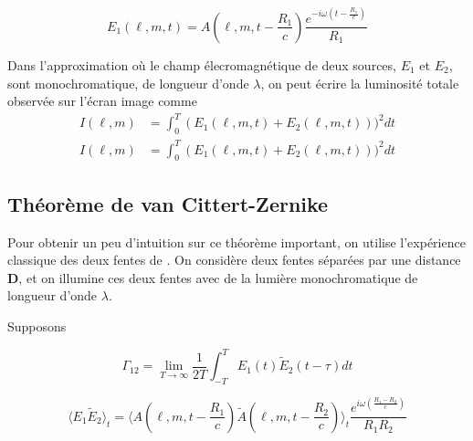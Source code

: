\begin{equation}\label{eq:E1}
        E_1(\ell, m, t) = A(\ell,m, t - \frac{R_1}{c}) \frac{e^{-i\omega (t - \frac{R_1}{c})}}{R_1} 
\end{equation} 

Dans l'approximation où le champ élecromagnétique de deux sources, $E_1$ et $E_2$, sont monochromatique, de longueur d'onde $\lambda$, on 
peut écrire la luminosité totale observée sur l'écran image comme
\begin{equation}\label{eq:Itot}
        \begin{aligned}
                I(\ell, m) &=  \int_{0}^{T} (E_1(\ell, m, t) + E_2(\ell, m, t)))^{2}dt \\[1.5ex]
                I(\ell, m) &=  \int_{0}^{T} (E_1(\ell, m, t) + E_2(\ell, m, t)))^{2}dt %
        \end{aligned}
\end{equation} 




\subsection{Théorème de van Cittert-Zernike}
Pour obtenir un peu d'intuition sur ce théorème important, on utilise l'expérience classique des deux 
fentes de \citep{Young}. On considère deux fentes séparées par une distance $\mathbf{D}$, et on illumine ces 
deux fentes avec de la lumière monochromatique de longueur d'onde $\lambda$.

Supposons

\begin{equation}\label{eq:Mutual Coherence}
        \Gamma_{12} = \lim_{T \rightarrow \infty } \frac{1}{2T} \int_{-T}^{T} E_{1}(t)\tilde{E}_2(t - \tau) dt 
\end{equation} 


\begin{equation}\label{eq:time average}
        \langle E_1\tilde{E}_2\rangle_{t} = \langle A(\ell,m,t - \frac{R_1}{c}) \tilde{A}(\ell,m,t - \frac{R_2}{c}) \rangle_t
       \frac{e^{i\omega(\frac{R_1 - R_2}{c})}}{R_1 R_2} 
\end{equation} 

